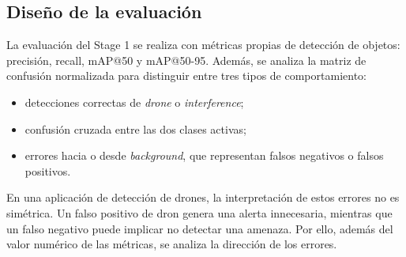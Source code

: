 \subsection{Diseño de la evaluación}
\label{subsec:diseno_evaluacion}

La evaluación del Stage 1 se realiza con métricas propias de detección de objetos: precisión, recall, mAP@50 y mAP@50-95. Además, se analiza la matriz de confusión normalizada para distinguir entre tres tipos de comportamiento:

\begin{itemize}
  \item detecciones correctas de \emph{drone} o \emph{interference};
  \item confusión cruzada entre las dos clases activas;
  \item errores hacia o desde \emph{background}, que representan falsos negativos o falsos positivos.
\end{itemize}

En una aplicación de detección de drones, la interpretación de estos errores no es simétrica. Un falso positivo de dron genera una alerta innecesaria, mientras que un falso negativo puede implicar no detectar una amenaza. Por ello, además del valor numérico de las métricas, se analiza la dirección de los errores.
